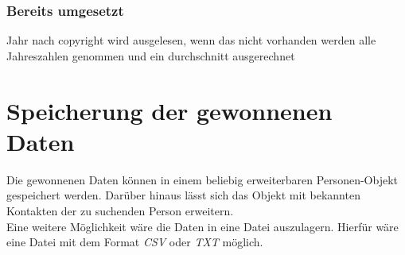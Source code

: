 		\subsubsection{Bereits umgesetzt}
		Jahr nach copyright wird ausgelesen, wenn das nicht vorhanden werden alle Jahreszahlen genommen und ein durchschnitt ausgerechnet

\section{Speicherung der gewonnenen Daten}
	Die gewonnenen Daten können in einem beliebig erweiterbaren Personen-Objekt gespeichert werden. Darüber hinaus lässt sich das Objekt mit bekannten Kontakten der zu suchenden Person erweitern.\\
	Eine weitere Möglichkeit wäre die Daten in eine Datei auszulagern. Hierfür wäre eine Datei mit dem Format \textit{CSV} oder \textit{TXT} möglich.